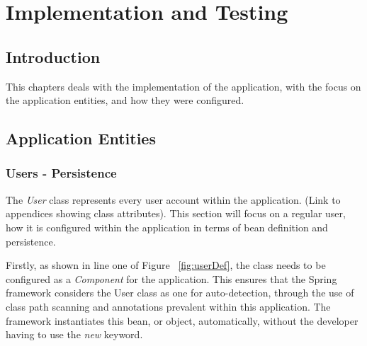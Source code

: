 \chapter{Implementation and Testing}
\label{impltesting}

\label{sec:impl}
\section{Introduction}

This chapters deals with the implementation of the application, with the focus on the application entities, and how they were configured.

\section{Application Entities}
\subsection{Users - Persistence}

The \textit{User} class represents every user account within the application. (Link to appendices showing class attributes). This section will focus on a regular user, how it is configured within the application in terms of bean definition and persistence. 

Firstly, as shown in line one of Figure ~\ref{fig:userDef}, the class needs to be configured as a \textit{Component} for the application. This ensures that the Spring framework considers the User class as one for auto-detection, through the use of class path scanning and annotations prevalent within this application. The framework instantiates this bean, or object, automatically, without the developer having to use the \textit{new} keyword.

